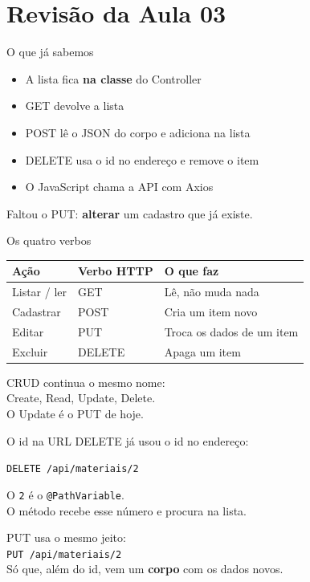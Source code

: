\documentclass[aspectratio=169,11pt]{beamer}
\begin{document}
\section{Revisão da Aula 03}

\begin{frame}{O que já sabemos}
  \begin{itemize}
    \item A lista fica \textbf{na classe} do Controller
    \item GET devolve a lista
    \item POST lê o JSON do corpo e adiciona na lista
    \item DELETE usa o id no endereço e remove o item
    \item O JavaScript chama a API com Axios
  \end{itemize}

  \vspace{0.7em}
  Faltou o PUT: \textbf{alterar} um cadastro que já existe.
\end{frame}

\begin{frame}{Os quatro verbos}
  \begin{center}
  \begin{tabular}{lll}
    \toprule
    Ação & Verbo HTTP & O que faz \\
    \midrule
    Listar / ler & GET & Lê, não muda nada \\
    Cadastrar & POST & Cria um item novo \\
    Editar & PUT & Troca os dados de um item \\
    Excluir & DELETE & Apaga um item \\
    \bottomrule
  \end{tabular}
  \end{center}

  \vspace{0.7em}
  CRUD continua o mesmo nome:\\
  Create, Read, Update, Delete.\\
  O Update é o PUT de hoje.
\end{frame}

\begin{frame}{O id na URL}
  DELETE já usou o id no endereço:

  \vspace{0.5em}
  \texttt{DELETE /api/materiais/2}

  \vspace{0.5em}
  O \texttt{2} é o \texttt{@PathVariable}.\\
  O método recebe esse número e procura na lista.

  \vspace{0.6em}
  PUT usa o mesmo jeito:\\
  \texttt{PUT /api/materiais/2}\\
  Só que, além do id, vem um \textbf{corpo} com os dados novos.
\end{frame}
\end{document}
